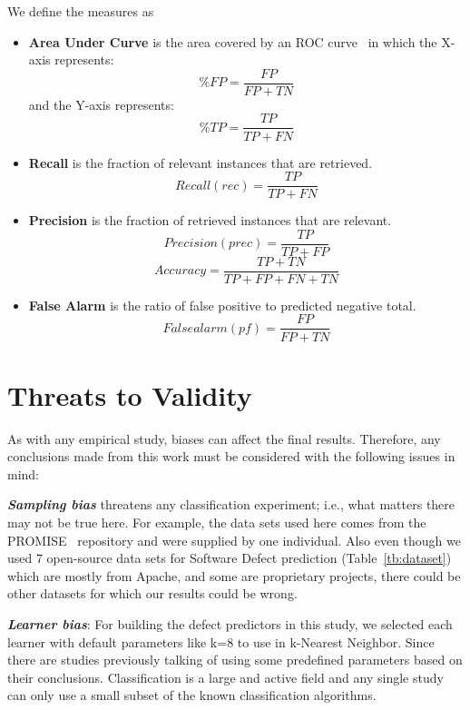 \documentclass[sigconf]{acmart}
\theoremstyle{break}
\begin{document}


We define the measures as
\begin{itemize}
\item \textbf{Area Under Curve} is the area covered by an ROC curve~\cite{swets1988measuring, duda2012pattern} in which the X-axis represents:
\[\%FP = \dfrac{FP}{FP + TN}\]
and the Y-axis represents:
\[\%TP = \dfrac{TP}{TP + FN}\]
\item \textbf{Recall}  is the fraction of relevant instances that are retrieved.
\[Recall(rec) = \dfrac{TP}{TP + FN}\]
\item \textbf{Precision} is the fraction of retrieved instances that are relevant.
\[Precision(prec) = \dfrac{TP}{TP + FP}\]
\[Accuracy = \dfrac{TP + TN}{TP + FP + FN + TN}\]
\item \textbf{False Alarm} is the ratio of false positive to predicted negative total.
\[False alarm(pf) = \dfrac{FP}{FP + TN}\]
\end{itemize}





\section{Threats to Validity}
\label{sect:validity}

As with any empirical study, biases can affect the final
results. Therefore, any conclusions made from this work must be considered with the following issues in mind:

\textbf{\textit{Sampling bias}} threatens any classification experiment; i.e., what matters there may not be true here. For example, the data sets used here comes from the PROMISE~\cite{promiserepo} repository and were supplied by one individual. Also even though we used 7 open-source data sets for Software Defect prediction (Table~\ref{tb:dataset}) which are mostly from Apache, and some are proprietary projects, there could be other datasets for which our results could be wrong.

\textbf{\textit{Learner bias}}: For building the defect predictors in this
study, we selected each learner with default parameters like k=8 to use in k-Nearest Neighbor. Since there are studies previously talking of using some predefined parameters based on their conclusions. Classification is a large and active field and any single study can only use a small subset of the known classification algorithms.
\end{document}
